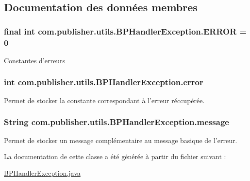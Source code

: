 \subsection{Documentation des données membres}
\hypertarget{classcom_1_1publisher_1_1utils_1_1BPHandlerException_a3aad32cd8b00b8e2935e58f8cac14a0f}{
\subsubsection[{E\-R\-R\-O\-R}]{\setlength{\rightskip}{0pt plus 5cm}final int com.\-publisher.\-utils.\-B\-P\-Handler\-Exception.\-E\-R\-R\-O\-R = 0\hspace{0.3cm}{\ttfamily [static]}}}\label{classcom_1_1publisher_1_1utils_1_1BPHandlerException_a3aad32cd8b00b8e2935e58f8cac14a0f}
Constantes d'erreurs \hypertarget{classcom_1_1publisher_1_1utils_1_1BPHandlerException_a22187f6ed53004154eead03978409a11}{
\subsubsection[{error}]{\setlength{\rightskip}{0pt plus 5cm}int com.\-publisher.\-utils.\-B\-P\-Handler\-Exception.\-error\hspace{0.3cm}{\ttfamily [private]}}}\label{classcom_1_1publisher_1_1utils_1_1BPHandlerException_a22187f6ed53004154eead03978409a11}
Permet de stocker la constante correspondant à l'erreur réccupérée. \hypertarget{classcom_1_1publisher_1_1utils_1_1BPHandlerException_ad64b758d099e991b5b86d489b56e582b}{
\subsubsection[{message}]{\setlength{\rightskip}{0pt plus 5cm}String com.\-publisher.\-utils.\-B\-P\-Handler\-Exception.\-message\hspace{0.3cm}{\ttfamily [private]}}}\label{classcom_1_1publisher_1_1utils_1_1BPHandlerException_ad64b758d099e991b5b86d489b56e582b}
Permet de stocker un message complémentaire au message basique de l'erreur. 

La documentation de cette classe a été générée à partir du fichier suivant \-:\begin{DoxyCompactItemize}
\item 
\hyperlink{BPHandlerException_8java}{B\-P\-Handler\-Exception.\-java}\end{DoxyCompactItemize}
